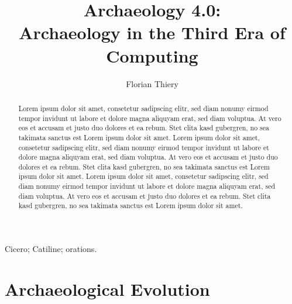 \documentclass[twocolumn]{autart}
\begin{document}
\begin{frontmatter}

\title{Archaeology 4.0: \protect\\ Archaeology in the Third Era of Computing}
                                               

\author[FT]{Florian Thiery}

\address[FT]{Research Software Engineer, Mainz, Germany}  %

          
\begin{keyword}                           %
Cicero; Catiline; orations.               %
\end{keyword}                             %


\begin{abstract}                         

Lorem ipsum dolor sit amet, consetetur sadipscing elitr, sed diam nonumy eirmod tempor invidunt ut labore et dolore magna aliquyam erat, sed diam voluptua. At vero eos et accusam et justo duo dolores et ea rebum. Stet clita kasd gubergren, no sea takimata sanctus est Lorem ipsum dolor sit amet. Lorem ipsum dolor sit amet, consetetur sadipscing elitr, sed diam nonumy eirmod tempor invidunt ut labore et dolore magna aliquyam erat, sed diam voluptua. At vero eos et accusam et justo duo dolores et ea rebum. Stet clita kasd gubergren, no sea takimata sanctus est Lorem ipsum dolor sit amet. Lorem ipsum dolor sit amet, consetetur sadipscing elitr, sed diam nonumy eirmod tempor invidunt ut labore et dolore magna aliquyam erat, sed diam voluptua. At vero eos et accusam et justo duo dolores et ea rebum. Stet clita kasd gubergren, no sea takimata sanctus est Lorem ipsum dolor sit amet. 

\end{abstract}

\end{frontmatter}

\section{Archaeological Evolution}
\end{document}
